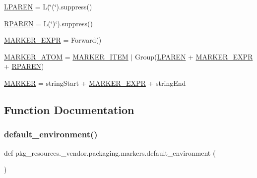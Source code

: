 \begin{DoxyCompactItemize}
\item 
\hyperlink{namespacepkg__resources_1_1__vendor_1_1packaging_1_1markers_ace0085073afe1a57ec624d43e5b78e21}{L\+P\+A\+R\+EN} = L(\char`\"{}(\char`\"{}).suppress()
\item 
\hyperlink{namespacepkg__resources_1_1__vendor_1_1packaging_1_1markers_af4e743ce6f7488481fa240e81ff53d28}{R\+P\+A\+R\+EN} = L(\char`\"{})\char`\"{}).suppress()
\item 
\hyperlink{namespacepkg__resources_1_1__vendor_1_1packaging_1_1markers_ad6937455ceb981e043cdc96dccc0cd34}{M\+A\+R\+K\+E\+R\+\_\+\+E\+X\+PR} = Forward()
\item 
\hyperlink{namespacepkg__resources_1_1__vendor_1_1packaging_1_1markers_a52cb8bdcc39333625dbfc286c6ca55a0}{M\+A\+R\+K\+E\+R\+\_\+\+A\+T\+OM} = \hyperlink{namespacepkg__resources_1_1__vendor_1_1packaging_1_1markers_a3bc10a62d60c2ff7909f82f01f639afd}{M\+A\+R\+K\+E\+R\+\_\+\+I\+T\+EM} $\vert$ Group(\hyperlink{namespacepkg__resources_1_1__vendor_1_1packaging_1_1markers_ace0085073afe1a57ec624d43e5b78e21}{L\+P\+A\+R\+EN} + \hyperlink{namespacepkg__resources_1_1__vendor_1_1packaging_1_1markers_ad6937455ceb981e043cdc96dccc0cd34}{M\+A\+R\+K\+E\+R\+\_\+\+E\+X\+PR} + \hyperlink{namespacepkg__resources_1_1__vendor_1_1packaging_1_1markers_af4e743ce6f7488481fa240e81ff53d28}{R\+P\+A\+R\+EN})
\item 
\hyperlink{namespacepkg__resources_1_1__vendor_1_1packaging_1_1markers_a547c502d835c4eb70ede60c42f471c11}{M\+A\+R\+K\+ER} = string\+Start + \hyperlink{namespacepkg__resources_1_1__vendor_1_1packaging_1_1markers_ad6937455ceb981e043cdc96dccc0cd34}{M\+A\+R\+K\+E\+R\+\_\+\+E\+X\+PR} + string\+End
\end{DoxyCompactItemize}


\subsection{Function Documentation}
\mbox{\label{namespacepkg__resources_1_1__vendor_1_1packaging_1_1markers_a3d0e91d534c7c8368d344f6be36538df}} 
\subsubsection{\texorpdfstring{default\+\_\+environment()}{default\_environment()}}
{\footnotesize\ttfamily def pkg\+\_\+resources.\+\_\+vendor.\+packaging.\+markers.\+default\+\_\+environment (\begin{DoxyParamCaption}{ }\end{DoxyParamCaption})}

